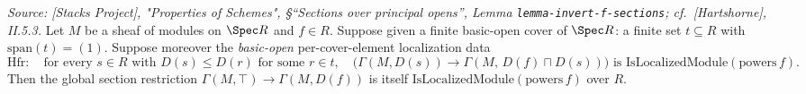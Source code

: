 
\begin{lemma}

  \label{lem:section_localization_descent_of_basicOpen_cover}
  \textit{Source: [Stacks Project], "Properties of Schemes", \S ``Sections over principal opens'',
  Lemma \texttt{lemma-invert-f-sections}; cf.\ [Hartshorne], II.5.3.}
  Let \(M\) be a sheaf of modules on \(\Spec R\) and \(f \in R\). Suppose given a finite basic-open
  cover of \(\Spec R\): a finite set \(t \subseteq R\) with \(\mathrm{span}(t) = (1)\). Suppose moreover
  the \emph{basic-open} per-cover-element localization data
  \[
    \mathrm{Hfr} : \quad \text{for every } s \in R \text{ with } D(s) \le D(r) \text{ for some } r \in t,
    \quad \bigl(\Gamma(M, D(s)) \longrightarrow \Gamma(M,\, D(f) \sqcap D(s))\bigr)
    \text{ is } \mathrm{IsLocalizedModule}(\mathrm{powers}\,f).
  \]
  Then the global section restriction \(\Gamma(M, \top) \to \Gamma(M, D(f))\) is itself
  \(\mathrm{IsLocalizedModule}(\mathrm{powers}\,f)\) over \(R\).
\end{lemma}
